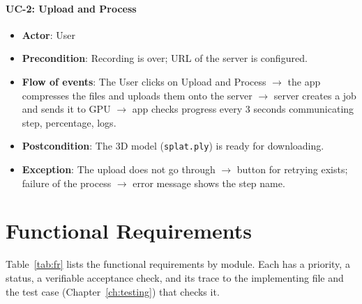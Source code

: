 \paragraph{UC-2: Upload and Process}
\begin{itemize}
    \item \textbf{Actor}: User
    \item \textbf{Precondition}: Recording is over; URL of the server is configured.
    \item \textbf{Flow of events}: The User clicks on Upload and Process $\rightarrow$ the app compresses the files and uploads them onto the server $\rightarrow$ server creates a job and sends it to GPU $\rightarrow$ app checks progress every 3 seconds communicating step, percentage, logs.
    \item \textbf{Postcondition}: The 3D model (\texttt{splat.ply}) is ready for downloading.
    \item \textbf{Exception}: The upload does not go through $\rightarrow$ button for retrying exists; failure of the process $\rightarrow$ error message shows the step name.
\end{itemize}

\section{Functional Requirements}
Table~\ref{tab:fr} lists the functional requirements by module. Each has a priority, a status, a verifiable acceptance check, and its trace to the implementing file and the test case (Chapter~\ref{ch:testing}) that checks it.

